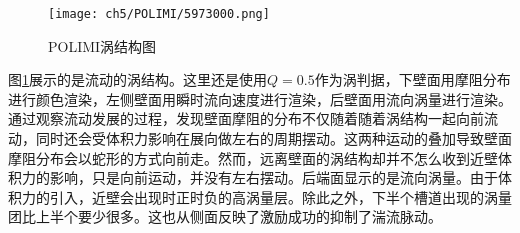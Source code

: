 \begin{figure}[htb]
  \centering
  \texttt{[image: ch5/POLIMI/5973000.png]}
  \caption{POLIMI涡结构图}\label{f:POLIM_vortex_structure}
\end{figure}
图\ref{f:POLIM_vortex_structure}展示的是流动的涡结构。这里还是使用$Q=0.5$作为涡判据，下壁面用摩阻分布进行颜色渲染，左侧壁面用瞬时流向速度进行渲染，后壁面用流向涡量进行渲染。通过观察流动发展的过程，发现壁面摩阻的分布不仅随着随着涡结构一起向前流动，同时还会受体积力影响在展向做左右的周期摆动。这两种运动的叠加导致壁面摩阻分布会以蛇形的方式向前走。然而，远离壁面的涡结构却并不怎么收到近壁体积力的影响，只是向前运动，并没有左右摆动。后端面显示的是流向涡量。由于体积力的引入，近壁会出现时正时负的高涡量层。除此之外，下半个槽道出现的涡量团比上半个要少很多。这也从侧面反映了激励成功的抑制了湍流脉动。

